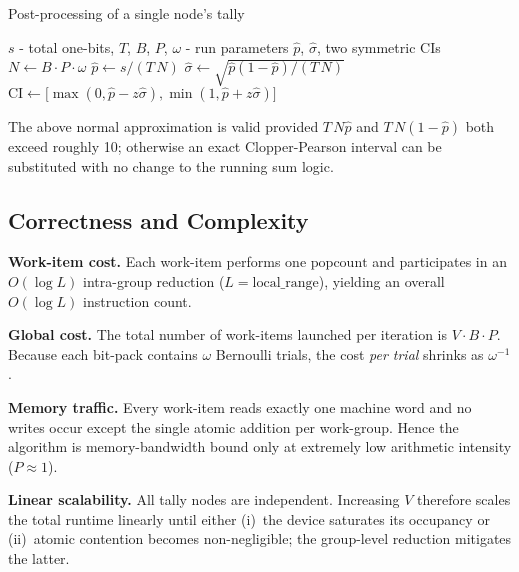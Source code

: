 \begin{algorithm}[H]
\caption{Post-processing of a single node's tally}
\label{alg:update_stats}
\begin{algorithmic}[1]
  \Require
    \(s\) - total one-bits,
    \(T\), \(B\), \(P\), \(\omega\) - run parameters
  \Ensure
    \(\widehat{p}\), \(\widehat{\sigma}\), two symmetric CIs
  \State $N\gets B\cdot P\cdot\omega$
  \State $\widehat{p}\gets s / (T\,N)$
  \State $\widehat{\sigma}\gets
          \sqrt{\widehat{p}(1-\widehat{p})/(T\,N)}$
      \State $\text{CI}\gets
        \bigl[\max(0,\widehat{p}-z\widehat{\sigma}),
              \min(1,\widehat{p}+z\widehat{\sigma})\bigr]$
  \EndFor
\end{algorithmic}
\end{algorithm}

The above normal approximation is valid provided \(T\,N\widehat{p}\)
and \(T\,N(1-\widehat{p})\) both exceed roughly 10; otherwise an exact
Clopper-Pearson interval can be substituted with no change to the running
sum logic.

\subsection{Correctness and Complexity}

\textbf{Work-item cost.}
Each work-item performs one \(\mathrm{popcount}\) and
participates in an \(O(\log L)\) intra-group reduction
(\(L\!=\!\text{local\_range}\)), yielding an overall
\(O(\log L)\) instruction count.

\textbf{Global cost.}
The total number of work-items launched per iteration is
\(V\cdot B\cdot P\).  Because each bit-pack contains \(\omega\) Bernoulli
trials, the cost \emph{per trial} shrinks as \(\omega^{-1}\).

\textbf{Memory traffic.}
Every work-item reads exactly one machine word and no writes occur except
the single atomic addition per work-group.  Hence the algorithm is
memory-bandwidth bound only at extremely low arithmetic intensity
(\(P\approx 1\)).

\textbf{Linear scalability.}
All tally nodes are independent.  Increasing \(V\) therefore scales the total
runtime linearly until either (i)~the device saturates its occupancy or
(ii)~atomic contention becomes non-negligible; the group-level reduction
mitigates the latter.